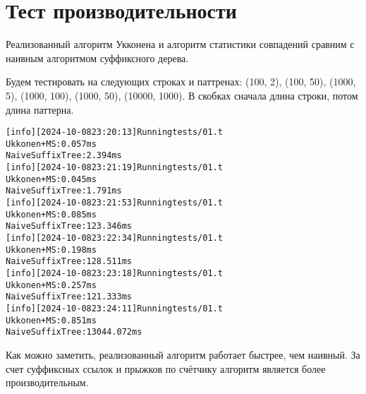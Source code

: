 \section{Тест производительности}

Реализованный алгоритм Укконена и алгоритм статистики совпадений сравним с наивным алгоритмом суффиксного дерева.

Будем тестировать на следующих строках и паттренах: (100, 2), (100, 50), (1000, 5), (1000, 100), (1000, 50), (10000, 1000). 
В скобках сначала длина строки, потом длина паттерна.

\begin{alltt}
[info] [2024-10-08 23:20:13] Running tests/01.t
Ukkonen+MS: 0.057 ms
Naive Suffix Tree: 2.394 ms
[info] [2024-10-08 23:21:19] Running tests/01.t
Ukkonen+MS: 0.045 ms
Naive Suffix Tree: 1.791 ms
[info] [2024-10-08 23:21:53] Running tests/01.t
Ukkonen+MS: 0.085 ms
Naive Suffix Tree: 123.346 ms
[info] [2024-10-08 23:22:34] Running tests/01.t
Ukkonen+MS: 0.198 ms
Naive Suffix Tree: 128.511 ms
[info] [2024-10-08 23:23:18] Running tests/01.t
Ukkonen+MS: 0.257 ms
Naive Suffix Tree: 121.333 ms
[info] [2024-10-08 23:24:11] Running tests/01.t
Ukkonen+MS: 0.851 ms
Naive Suffix Tree: 13044.072 ms
\end{alltt}

Как можно заметить, реализованный алгоритм работает быстрее, чем наивный. 
За счет суффиксных ссылок и прыжков по счётчику алгоритм является более производительным.
\pagebreak
